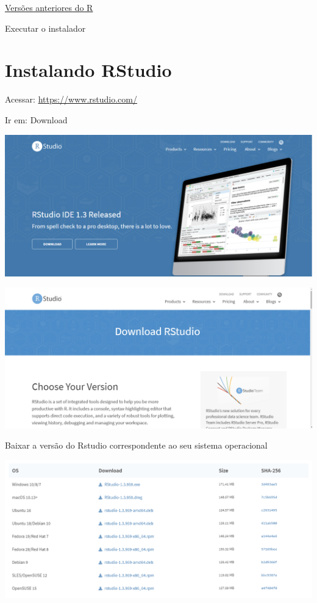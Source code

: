 \documentclass[
]{book}
\begin{document}
\href{https://cran.r-project.org/bin/windows/base/old/}{Versões anteriores do R}

Executar o instalador

\hypertarget{instalando-rstudio}{%
\section{Instalando RStudio}\label{instalando-rstudio}}

Acessar: \url{https://www.rstudio.com/}

Ir em: Download

\includegraphics{install6.png}

\includegraphics{install7.png}

Baixar a versão do Rstudio correspondente ao seu sistema operacional

\includegraphics{install8.png}
\end{document}
